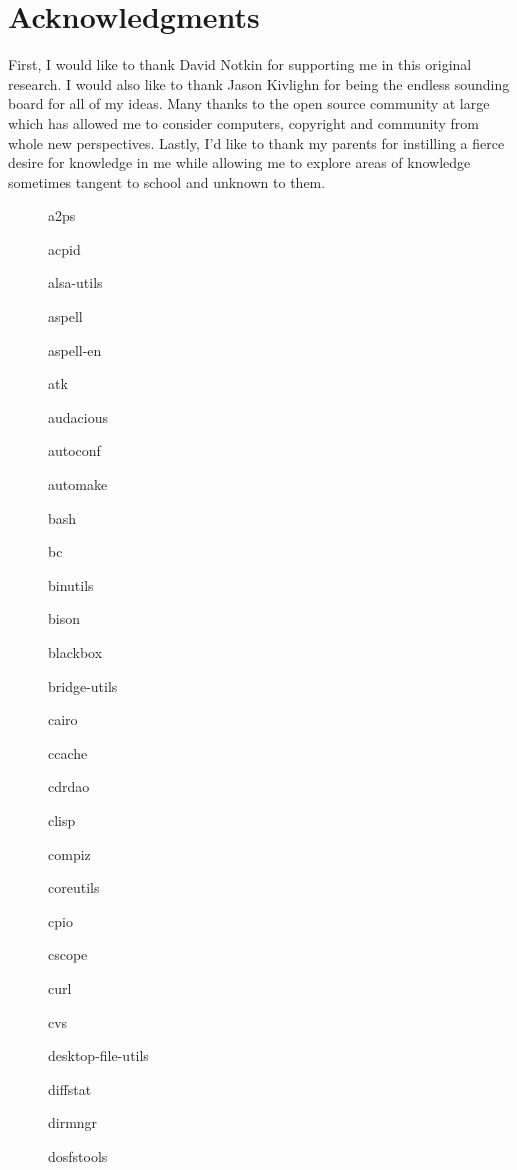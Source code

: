\documentclass[letterpaper,10pt]{article}
\begin{document}
\section{Acknowledgments}
First, I would like to thank David Notkin for supporting me in this original research.  I would also like to thank Jason Kivlighn for being the endless sounding board for all of my ideas.  Many thanks to the open source community at large which has allowed me to consider computers, copyright and community from whole new perspectives.  Lastly, I'd like to thank my parents for instilling a fierce desire for knowledge in me while allowing me to explore areas of knowledge sometimes tangent to school and unknown to them.
\appendix
\setlength{\columnsep}{0pt}
\begin{figure}[h]
  \begin{multicols}{3}
  \begin{itemize*}
    \item a2ps
    \item acpid
    \item alsa-utils
    \item aspell
    \item aspell-en
    \item atk
    \item audacious
    \item autoconf
    \item automake
    \item bash
    \item bc
    \item binutils
    \item bison
    \item blackbox
    \item bridge-utils
    \item cairo
    \item ccache
    \item cdrdao
    \item clisp
    \item compiz
    \item coreutils
    \item cpio
    \item cscope
    \item curl
    \item cvs
    \item desktop-file-utils
    \item diffstat
    \item dirmngr
    \item dosfstools

\end{itemize*}
\end{multicols}
\end{figure}
\end{document}
